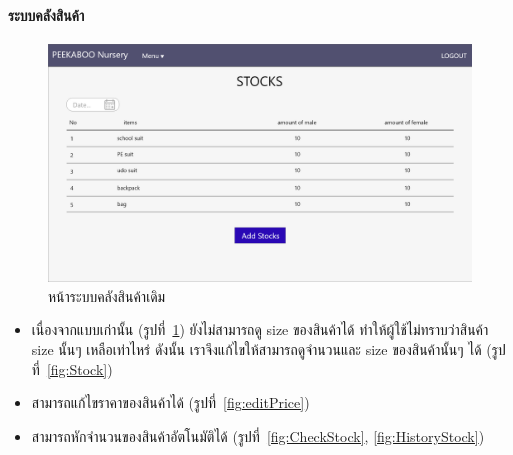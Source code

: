 \paragraph{ระบบคลังสินค้า}
\begin{figure}
  \begin{center}
    \includegraphics[width=\linewidth]{images/stockPage.png}
  \end{center}
  \caption{หน้าระบบคลังสินค้าเดิม}
  \label{fig:old2}
\end{figure}
\begin{itemize}
    \item เนื่องจากแบบเก่านั้น (รูปที่~\ref{fig:old2}) ยังไม่สามารถดู size ของสินค้าได้ ทำให้ผู้ใช้ไม่ทราบว่าสินค้า size นั้นๆ เหลือเท่าไหร่ ดังนั้น เราจึงแก้ไขให้สามารถดูจำนวนและ size ของสินค้านั้นๆ ได้ (รูปที่~\ref{fig:Stock})
    \item สามารถแก้ไขราคาของสินค้าได้ (รูปที่~\ref{fig:editPrice})
    \item สามารถหักจำนวนของสินค้าอัตโนมัติได้ (รูปที่~\ref{fig:CheckStock}, \ref{fig:HistoryStock})
\end{itemize}
